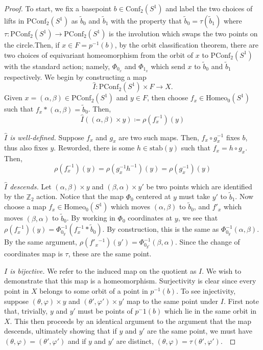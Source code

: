 \documentclass[10pt, oneside]{article}
\newcommand{\Z}{\mathbb{Z}}
\newcommand{\homeoS}{\text{Homeo}_0(S^1)}
\newcommand{\conf}[1]{\text{Conf}_{#1}(S^1)}
\newcommand{\pconf}[1]{\text{PConf}_{#1}(S^1)}
\theoremstyle{definition}
\theoremstyle{definition}
\begin{document}
\begin{proof}
    To start, we fix a basepoint $b\in \conf{2}$ and label the two choices of lifts in $\pconf{2}$ as $\tilde{b}_0$ and $\tilde{b}_1$ with the property that $\tilde{b}_0 = \tau(\tilde{b}_1)$ where $\tau:\pconf{2}\to\pconf{2}$ is the involution which swaps the two points on the circle.Then, if $x\in F=p^{-1}(b)$, by the orbit classification theorem, there are two choices of equivariant homeomorphism from the orbit of $x$ to $\pconf{2}$ with the standard action; namely, $\Phi_{0_x}$ and $\Phi_{1_x}$ which send $x$ to $\tilde{b}_0$ and $\tilde{b}_1$ respectively.
    We begin by constructing a map
    $$\hat{I}: \pconf{2}\times F \to X.$$
    Given $x=(\alpha, \beta)\in \pconf{2}$ and $y\in F$, then choose $f_x\in\homeoS$ such that $f_x*(\alpha, \beta) = \tilde{b}_0$. Then,
    $$\hat{I}((\alpha, \beta)\times y) \coloneqq \rho(f_x^{-1})(y)$$

    {\it $\hat{I}$ is well-defined.} Suppose $f_x$ and $g_x$ are two such maps. Then, $f_x\circ g_x^{-1}$ fixes $b$, thus also fixes $y$. Reworded, there is some $h\in \text{stab}(y)$ such that $f_x = h\circ g_x$. Then,
    $$\rho(f_x^{-1})(y) = \rho(g_x^{-1}h^{-1})(y) = \rho(g_x^{-1})(y)$$

    {\it $\hat{I}$ descends.} Let $(\alpha, \beta)\times y$ and $(\beta, \alpha)\times y'$ be two points which are identified by the $\Z_2$ action. Notice that the map $\Phi_0$ centered at $y$ must take $y'$ to $\tilde{b}_1$. Now choose a map $f_x\in\homeoS$ which moves $(\alpha, \beta)$ to $\tilde{b}_0$, and $f'_x$ which moves $(\beta, \alpha)$ to $\tilde{b}_0$. By working in $\Phi_0$ coordinates at $y$, we see that $\rho(f_x^{-1})(y) = \Phi_{0_y}^{-1}(f_x^{-1} * \tilde{b}_0)$. By construction, this is the same as $\Phi_{0_y}^{-1}(\alpha, \beta)$. By the same argument, $\rho(f'{_x}^{-1})(y') = \Phi_{0_{y'}}^{-1}(\beta, \alpha)$. Since the change of coordinates map is $\tau$, these are the same point. 

   {\it $I$ is bijective.} We refer to the induced map on the quotient as $I$. We wish to demonstrate that this map is a homeomorphism. Surjectivity is clear since every point in $X$ belongs to some orbit of a point in $p^{-1}(b)$. To see injectivity, suppose $(\theta, \varphi)\times y$ and $(\theta', \varphi')\times y'$ map to the same point under $I$. First note that, trivially, $y$ and $y'$ must be points of $p^-1(b)$ which lie in the same orbit in $X$. This then proceeds by an identical argument to the argument that the map descends, ultimately showing that if $y$ and $y'$ are the same point, we must have $(\theta, \varphi) = (\theta', \varphi')$ and if $y$ and $y'$ are distinct, $(\theta, \varphi) = \tau(\theta', \varphi')$.\


\end{proof}
\end{document}
